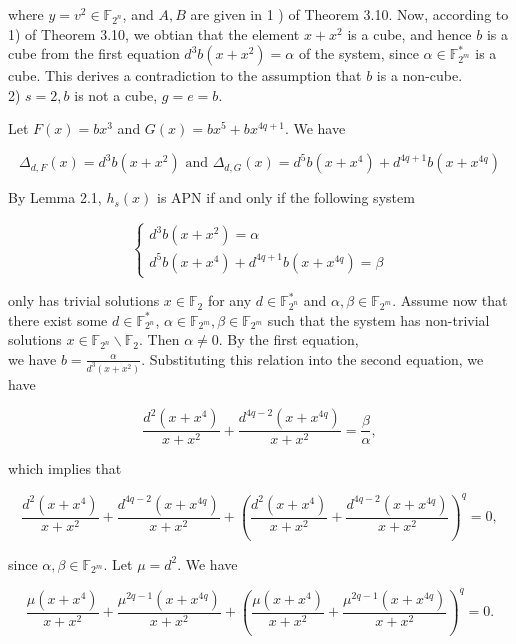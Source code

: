 \documentclass[10pt]{article}
\begin{document}
where $y=v^{2} \in \mathbb{F}_{2^{n}}$, and $A, B$ are given in 1 ) of Theorem 3.10. Now, according to 1) of Theorem 3.10, we obtian that the element $x+x^{2}$ is a cube, and hence $b$ is a cube from the first equation $d^{3} b\left(x+x^{2}\right)=\alpha$ of the system, since $\alpha \in \mathbb{F}_{2^{m}}^{*}$ is a cube. This derives a contradiction to the assumption that $b$ is a non-cube.\\
2) $s=2, b$ is not a cube, $g=e=b$.

Let $F(x)=b x^{3}$ and $G(x)=b x^{5}+b x^{4 q+1}$. We have

$$
\Delta_{d, F}(x)=d^{3} b\left(x+x^{2}\right) \text { and } \Delta_{d, G}(x)=d^{5} b\left(x+x^{4}\right)+d^{4 q+1} b\left(x+x^{4 q}\right)
$$

By Lemma 2.1, $h_{s}(x)$ is APN if and only if the following system

$$
\left\{\begin{array}{l}
d^{3} b\left(x+x^{2}\right)=\alpha \\
d^{5} b\left(x+x^{4}\right)+d^{4 q+1} b\left(x+x^{4 q}\right)=\beta
\end{array}\right.
$$

only has trivial solutions $x \in \mathbb{F}_{2}$ for any $d \in \mathbb{F}_{2^{n}}^{*}$ and $\alpha, \beta \in \mathbb{F}_{2^{m}}$. Assume now that there exist some $d \in \mathbb{F}_{2^{n}}^{*}$, $\alpha \in \mathbb{F}_{2^{m}}, \beta \in \mathbb{F}_{2^{m}}$ such that the system has non-trivial solutions $x \in \mathbb{F}_{2^{n}} \backslash \mathbb{F}_{2}$. Then $\alpha \neq 0$. By the first equation,\\
we have $b=\frac{\alpha}{d^{3}\left(x+x^{2}\right)}$. Substituting this relation into the second equation, we have

$$
\frac{d^{2}\left(x+x^{4}\right)}{x+x^{2}}+\frac{d^{4 q-2}\left(x+x^{4 q}\right)}{x+x^{2}}=\frac{\beta}{\alpha},
$$

which implies that

$$
\frac{d^{2}\left(x+x^{4}\right)}{x+x^{2}}+\frac{d^{4 q-2}\left(x+x^{4 q}\right)}{x+x^{2}}+\left(\frac{d^{2}\left(x+x^{4}\right)}{x+x^{2}}+\frac{d^{4 q-2}\left(x+x^{4 q}\right)}{x+x^{2}}\right)^{q}=0,
$$

since $\alpha, \beta \in \mathbb{F}_{2^{m}}$. Let $\mu=d^{2}$. We have


\begin{equation*}
\frac{\mu\left(x+x^{4}\right)}{x+x^{2}}+\frac{\mu^{2 q-1}\left(x+x^{4 q}\right)}{x+x^{2}}+\left(\frac{\mu\left(x+x^{4}\right)}{x+x^{2}}+\frac{\mu^{2 q-1}\left(x+x^{4 q}\right)}{x+x^{2}}\right)^{q}=0 . \tag{16}
\end{equation*}
\end{document}
